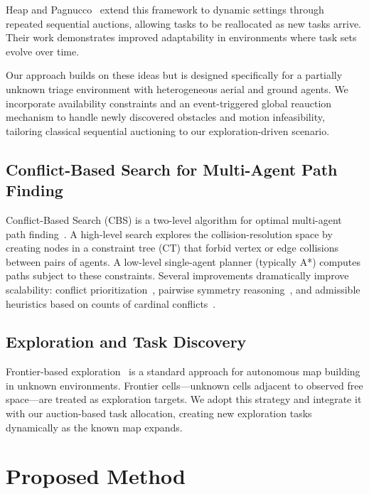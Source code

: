 \documentclass[conference]{IEEEtran}
\begin{document}
Heap and Pagnucco~\cite{heap2013repeated} extend this framework to dynamic settings through repeated sequential auctions, allowing tasks to be reallocated as new tasks arrive. Their work demonstrates improved adaptability in environments where task sets evolve over time.

Our approach builds on these ideas but is designed specifically for a partially unknown triage environment with heterogeneous aerial and ground agents. We incorporate availability constraints and an event-triggered global reauction mechanism to handle newly discovered obstacles and motion infeasibility, tailoring classical sequential auctioning to our exploration-driven scenario.

\subsection{Conflict-Based Search for Multi-Agent Path Finding}

Conflict-Based Search (CBS) is a two-level algorithm for optimal multi-agent path finding~\cite{sharon2012cbs}. A high-level search explores the collision-resolution space by creating nodes in a constraint tree (CT) that forbid vertex or edge collisions between pairs of agents. A low-level single-agent planner (typically A*) computes paths subject to these constraints. Several improvements dramatically improve scalability: conflict prioritization~\cite{boyarski2015icbs}, pairwise symmetry reasoning~\cite{li2021symmetry}, and admissible heuristics based on counts of cardinal conflicts~\cite{felner2018heuristics}.

\subsection{Exploration and Task Discovery}

Frontier-based exploration~\cite{yamauchi1997frontier} is a standard approach for autonomous map building in unknown environments. Frontier cells---unknown cells adjacent to observed free space---are treated as exploration targets. We adopt this strategy and integrate it with our auction-based task allocation, creating new exploration tasks dynamically as the known map expands.

\section{Proposed Method}
\end{document}
